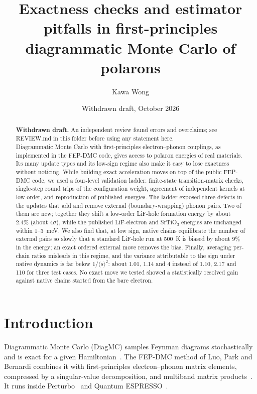 \documentclass[aps,prb,reprint,superscriptaddress,nofootinbib]{revtex4-2}
\newcommand{\avg}[1]{\langle #1\rangle}
\begin{document}
\title{Exactness checks and estimator pitfalls in first-principles diagrammatic Monte Carlo of polarons}

\author{Kawa Wong}
\affiliation{[Affiliation]}

\date{Withdrawn draft, October 2026}

\begin{abstract}
\textbf{Withdrawn draft.} An independent review found errors and overclaims; see REVIEW.md in this folder before using any statement here.\\[4pt]
Diagrammatic Monte Carlo with first-principles electron--phonon couplings, as implemented in the FEP-DMC code, gives access to polaron energies of real materials. Its many update types and its low-sign regime also make it easy to lose exactness without noticing. While building exact acceleration moves on top of the public FEP-DMC code, we used a four-level validation ladder: finite-state transition-matrix checks, single-step round trips of the configuration weight, agreement of independent kernels at low order, and reproduction of published energies. The ladder exposed three defects in the updates that add and remove external (boundary-wrapping) phonon pairs. Two of them are new; together they shift a low-order LiF-hole formation energy by about 2.4\% (about $4\sigma$), while the published LiF-electron and SrTiO$_3$ energies are unchanged within 1--3~meV. We also find that, at low sign, native chains equilibrate the number of external pairs so slowly that a standard LiF-hole run at 500~K is biased by about 9\% in the energy; an exact ordered external move removes the bias. Finally, averaging per-chain ratios misleads in this regime, and the variance attributable to the sign under native dynamics is far below $1/\avg{s}^2$: about 1.01, 1.14 and 4 instead of 1.10, 2.17 and 110 for three test cases. No exact move we tested showed a statistically resolved gain against native chains started from the bare electron.
\end{abstract}

\maketitle

\section{Introduction}

Diagrammatic Monte Carlo (DiagMC) samples Feynman diagrams stochastically and is exact for a given Hamiltonian~\cite{Prokofev1998,Mishchenko2000}. The FEP-DMC method of Luo, Park and Bernardi combines it with first-principles electron--phonon matrix elements, compressed by a singular-value decomposition, and multiband matrix products~\cite{Luo2025}. It runs inside Perturbo~\cite{Perturbo2021} and Quantum ESPRESSO~\cite{QE2009}.
\end{document}
